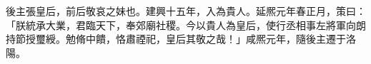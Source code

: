 \begin{pinyinscope}
 
 
 後主張皇后，前后敬哀之妹也。建興十五年，入為貴人。延熈元年春正月，策曰：「朕統承大業，君臨天下，奉郊廟社稷。今以貴人為皇后，使行丞相事左將軍向朗持節授璽綬。勉脩中饋，恪肅禋祀，皇后其敬之哉！」咸熈元年，隨後主遷于洛陽。
 
 
 
 
\end{pinyinscope}
